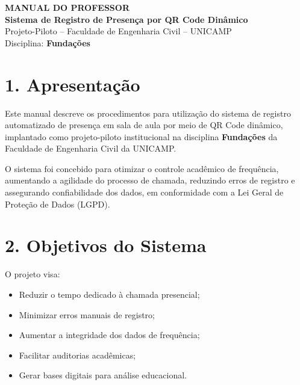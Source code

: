 \documentclass[12pt,a4paper]{article}
\begin{document}
\begin{center}
    \Large\textbf{MANUAL DO PROFESSOR}\\[0.3cm]
    \large\textbf{Sistema de Registro de Presença por QR Code Dinâmico}\\[0.3cm]
    \normalsize Projeto-Piloto -- Faculdade de Engenharia Civil -- UNICAMP\\
    Disciplina: \textbf{Fundações}
\end{center}

\vspace{1cm}


\section*{1. Apresentação}

Este manual descreve os procedimentos para utilização do sistema de registro automatizado de presença em sala de aula por meio de QR Code dinâmico, implantado como projeto-piloto institucional na disciplina \textbf{Fundações} da Faculdade de Engenharia Civil da UNICAMP.

O sistema foi concebido para otimizar o controle acadêmico de frequência, aumentando a agilidade do processo de chamada, reduzindo erros de registro e assegurando confiabilidade dos dados, em conformidade com a Lei Geral de Proteção de Dados (LGPD).


\section*{2. Objetivos do Sistema}

O projeto visa:

\begin{itemize}
    \item Reduzir o tempo dedicado à chamada presencial;
    \item Minimizar erros manuais de registro;
    \item Aumentar a integridade dos dados de frequência;
    \item Facilitar auditorias acadêmicas;
    \item Gerar bases digitais para análise educacional.
\end{itemize}

\end{document}
